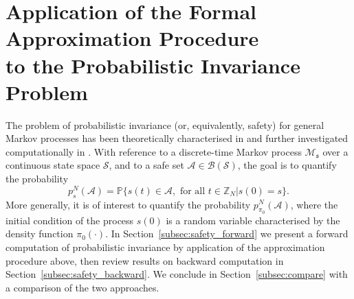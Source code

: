 \documentclass{LMCS}
\begin{document}
\section{Application of the Formal Approximation Procedure\\ to the Probabilistic Invariance Problem}
\label{sec:safety}
The problem of probabilistic invariance (or, equivalently, safety) for general Markov processes has been theoretically characterised in \cite{APLS08}  
and further investigated computationally in \cite{APKL10,SA11,SAH12,SA12}. 
With reference to a discrete-time Markov process $\mathscr M_{\mathfrak s}$ over a continuous state space $\mathcal S$, 
and to a safe set $\mathcal A \in \mathcal B(\mathcal S)$, 
the goal is to quantify the probability
\begin{equation*}
p_s^N(\mathcal A) = \mathbb P\{s(t)\in\mathcal A,\text{ for all } t\in\mathbb Z_N | s(0) = s\}. 
\end{equation*}
More generally, it is of interest to quantify the probability $p_{\pi_0}^N(\mathcal A)$, 
where the initial condition of the process $s(0)$ is a random variable characterised by the density function $\pi_0(\cdot)$.
In Section~\ref{subsec:safety_forward} we present a forward computation of probabilistic invariance by application of the approximation procedure above,  
then review results on backward computation \cite{APKL10,SA11,SAH12,SA12} in Section~\ref{subsec:safety_backward}. 
We conclude in Section~\ref{subsec:compare} with a comparison of the two approaches. 
\end{document}
